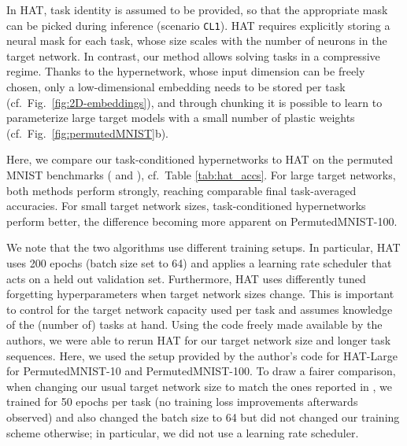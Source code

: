 \documentclass{article}
\begin{document}
In HAT, task identity is assumed to be provided, so that the appropriate mask can be picked during inference (scenario \texttt{CL1}). HAT requires explicitly storing a neural mask for each task, whose size scales with the number of neurons in the target network. In contrast, our method allows solving tasks in a compressive regime. Thanks to the hypernetwork, whose input dimension can be freely chosen, only a low-dimensional embedding needs to be stored per task (cf.~Fig.~\ref{fig:2D-embeddings}), and through chunking it is possible to learn to parameterize large target models with a small number of plastic weights (cf.~Fig.~\ref{fig:permutedMNIST}b).

Here, we compare our task-conditioned hypernetworks to HAT on the permuted MNIST benchmarks ( and ), cf.~Table \ref{tab:hat_accs}. For large target networks, both methods perform strongly, reaching comparable final task-averaged accuracies. For small target network sizes, task-conditioned hypernetworks perform better, the difference becoming more apparent on PermutedMNIST-100.

We note that the two algorithms use different training setups. In particular, HAT uses 200 epochs (batch size set to 64) and applies a learning rate scheduler that acts on a held out validation set. Furthermore, HAT uses differently tuned forgetting hyperparameters when target network sizes change. This is important to control for the target network capacity used per task and assumes knowledge of the (number of) tasks at hand. Using the code freely made available by the authors, we were able to rerun HAT for our target network size and longer task sequences. Here, we used the setup provided by the author's code for HAT-Large for PermutedMNIST-10 and PermutedMNIST-100. 
To draw a fairer comparison, when changing our usual target network size to match the ones reported in \citet{pmlr-v80-serra18a}, we trained for 50 epochs per task (no training loss improvements afterwards observed) and also changed the batch size to 64 but did not changed our training scheme otherwise; in particular, we did not use a learning rate scheduler.
\end{document}
